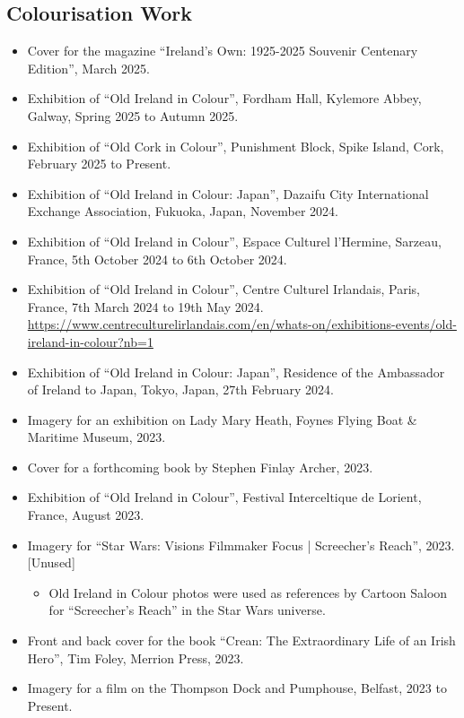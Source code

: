 \documentclass[10pt,a4paper]{res} %
\begin{document}
\begin{resume}
\subsection*{Colourisation Work}

\begin{itemize} \itemsep -2pt
\item Cover for the magazine ``Ireland's Own: 1925-2025 Souvenir Centenary Edition'', March 2025.
\item Exhibition of ``Old Ireland in Colour'', Fordham Hall, Kylemore Abbey, Galway, Spring 2025 to Autumn 2025.
\item Exhibition of ``Old Cork in Colour'', Punishment Block, Spike Island, Cork, February 2025 to Present.
\item Exhibition of ``Old Ireland in Colour: Japan'', Dazaifu City International Exchange Association, Fukuoka, Japan, November 2024.
\item Exhibition of ``Old Ireland in Colour'', Espace Culturel l'Hermine, Sarzeau, France, 5th October 2024 to 6th October 2024.
\item Exhibition of ``Old Ireland in Colour'', Centre Culturel Irlandais, Paris, France, 7th March 2024 to 19th May 2024. \url{https://www.centreculturelirlandais.com/en/whats-on/exhibitions-events/old-ireland-in-colour?nb=1}
\item Exhibition of ``Old Ireland in Colour: Japan'', Residence of the Ambassador of Ireland to Japan, Tokyo, Japan, 27th February 2024.
\item Imagery for an exhibition on Lady Mary Heath, Foynes Flying Boat \& Maritime Museum, 2023.
\item Cover for a forthcoming book by Stephen Finlay Archer, 2023.
\item Exhibition of ``Old Ireland in Colour'', Festival Interceltique de Lorient, France, August 2023.
\item Imagery for ``Star Wars: Visions Filmmaker Focus | Screecher's Reach'', 2023. [Unused]
\begin{itemize} \itemsep -2pt
\item Old Ireland in Colour photos were used as references by Cartoon Saloon for ``Screecher's Reach'' in the Star Wars universe.
\end{itemize}
\item Front and back cover for the book ``Crean: The Extraordinary Life of an Irish Hero'', Tim Foley, Merrion Press, 2023.
\item Imagery for a film on the Thompson Dock and Pumphouse, Belfast, 2023 to Present.

\end{itemize}
\end{resume}
\end{document}
